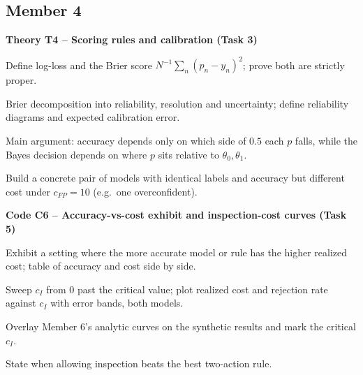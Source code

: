 \documentclass[11pt,a4paper]{article}
\begin{document}
\subsection*{Member 4}
\textbf{Theory T4 -- Scoring rules and calibration (Task 3)}
\begin{todo}
  \item Define log-loss and the Brier score $N^{-1}\sum_n (p_n-y_n)^2$; prove both are strictly proper.
  \item Brier decomposition into reliability, resolution and uncertainty; define reliability diagrams and expected calibration error.
  \item Main argument: accuracy depends only on which side of $0.5$ each $p$ falls, while the Bayes decision depends on where $p$ sits relative to $\theta_0,\theta_1$.
  \item Build a concrete pair of models with identical labels and accuracy but different cost under $c_{FP}=10$ (e.g.\ one overconfident).
\end{todo}
\textbf{Code C6 -- Accuracy-vs-cost exhibit and inspection-cost curves (Task 5)}
\begin{todo}
  \item Exhibit a setting where the more accurate model or rule has the higher realized cost; table of accuracy and cost side by side.
  \item Sweep $c_I$ from $0$ past the critical value; plot realized cost and rejection rate against $c_I$ with error bands, both models.
  \item Overlay Member 6's analytic curves on the synthetic results and mark the critical $c_I$.
  \item State when allowing inspection beats the best two-action rule.
\end{todo}
\end{document}
